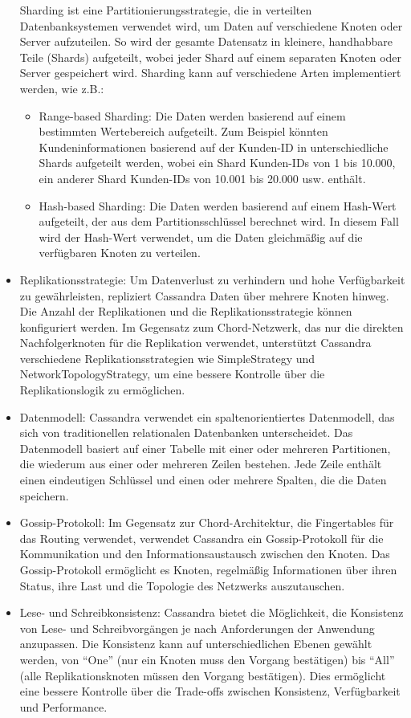 \documentclass[../vs-script-first-v01.tex]{subfiles}
\begin{document}
\begin{itemize}
Sharding ist eine Partitionierungsstrategie, die in verteilten Datenbanksystemen verwendet wird, um Daten auf verschiedene Knoten oder Server aufzuteilen. So wird der gesamte Datensatz in kleinere, handhabbare Teile (Shards) aufgeteilt, wobei jeder Shard auf einem separaten Knoten oder Server gespeichert wird. Sharding kann auf verschiedene Arten implementiert werden, wie z.B.:
\begin{itemize} 
\item Range-based Sharding: Die Daten werden basierend auf einem bestimmten Wertebereich aufgeteilt. Zum Beispiel könnten Kundeninformationen basierend auf der Kunden-ID in unterschiedliche Shards aufgeteilt werden, wobei ein Shard Kunden-IDs von 1 bis 10.000, ein anderer Shard Kunden-IDs von 10.001 bis 20.000 usw. enthält.
\item Hash-based Sharding: Die Daten werden basierend auf einem Hash-Wert aufgeteilt, der aus dem Partitionsschlüssel berechnet wird. In diesem Fall wird der Hash-Wert verwendet, um die Daten gleichmäßig auf die verfügbaren Knoten zu verteilen.
\end{itemize}  
\item Replikationsstrategie: Um Datenverlust zu verhindern und hohe Verfügbarkeit zu gewährleisten, repliziert Cassandra Daten über mehrere Knoten hinweg. Die Anzahl der Replikationen und die Replikationsstrategie können konfiguriert werden. Im Gegensatz zum Chord-Netzwerk, das nur die direkten Nachfolgerknoten für die Replikation verwendet, unterstützt Cassandra verschiedene Replikationsstrategien wie SimpleStrategy und NetworkTopologyStrategy, um eine bessere Kontrolle über die Replikationslogik zu ermöglichen.
\item Datenmodell: Cassandra verwendet ein spaltenorientiertes Datenmodell, das sich von traditionellen relationalen Datenbanken unterscheidet. Das Datenmodell basiert auf einer Tabelle mit einer oder mehreren Partitionen, die wiederum aus einer oder mehreren Zeilen bestehen. Jede Zeile enthält einen eindeutigen Schlüssel und einen oder mehrere Spalten, die die Daten speichern.
\item Gossip-Protokoll: Im Gegensatz zur Chord-Architektur, die Fingertables für das Routing verwendet, verwendet Cassandra ein Gossip-Protokoll für die Kommunikation und den Informationsaustausch zwischen den Knoten. Das Gossip-Protokoll ermöglicht es Knoten, regelmäßig Informationen über ihren Status, ihre Last und die Topologie des Netzwerks auszutauschen.
\item Lese- und Schreibkonsistenz: Cassandra bietet die Möglichkeit, die Konsistenz von Lese- und Schreibvorgängen je nach Anforderungen der Anwendung anzupassen. Die Konsistenz kann auf unterschiedlichen Ebenen gewählt werden, von \enquote{One} (nur ein Knoten muss den Vorgang bestätigen) bis \enquote{All} (alle Replikationsknoten müssen den Vorgang bestätigen). Dies ermöglicht eine bessere Kontrolle über die Trade-offs zwischen Konsistenz, Verfügbarkeit und Performance.

\end{itemize}
\end{document}
